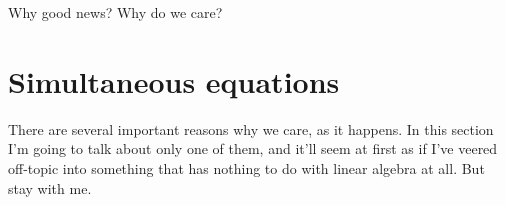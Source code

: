 Why good news? Why do we care?

\section{Simultaneous equations}

There are several important reasons why we care, as it happens. In this section
I'm going to talk about only one of them, and it'll seem at first as if I've
veered off-topic into something that has nothing to do with linear algebra at
all. But stay with me.




